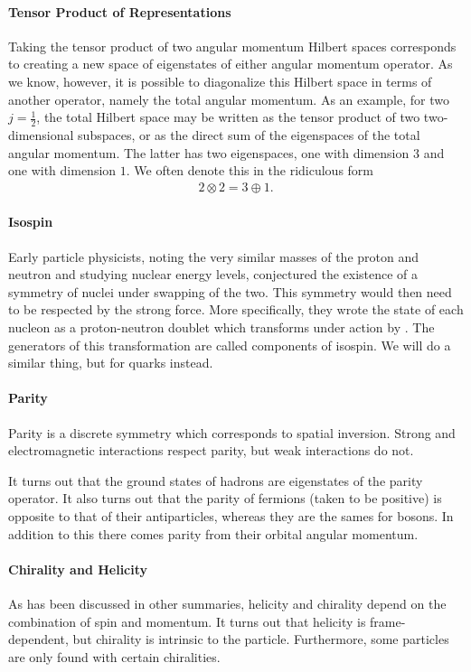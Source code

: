 \paragraph{Tensor Product of  Representations}
Taking the tensor product of two angular momentum Hilbert spaces corresponds to creating a new space of eigenstates of either angular momentum operator. As we know, however, it is possible to diagonalize this Hilbert space in terms of another operator, namely the total angular momentum. As an example, for two $j = \frac{1}{2}$, the total Hilbert space may be written as the tensor product of two two-dimensional subspaces, or as the direct sum of the eigenspaces of the total angular momentum. The latter has two eigenspaces, one with dimension $3$ and one with dimension $1$. We often denote this in the ridiculous form
\begin{align*}
	2\otimes 2 = 3\oplus 1.
\end{align*}

\paragraph{Isospin}
Early particle physicists, noting the very similar masses of the proton and neutron and studying nuclear energy levels, conjectured the existence of a symmetry of nuclei under swapping of the two. This symmetry would then need to be respected by the strong force. More specifically, they wrote the state of each nucleon as a proton-neutron doublet which transforms under action by . The generators of this transformation are called components of isospin. We will do a similar thing, but for quarks instead.

\paragraph{Parity}
Parity is a discrete symmetry which corresponds to spatial inversion. Strong and electromagnetic interactions respect parity, but weak interactions do not.

It turns out that the ground states of hadrons are eigenstates of the parity operator. It also turns out that the parity of fermions (taken to be positive) is opposite to that of their antiparticles, whereas they are the sames for bosons. In addition to this there comes parity from their orbital angular momentum.

\paragraph{Chirality and Helicity}
As has been discussed in other summaries, helicity and chirality depend on the combination of spin and momentum. It turns out that helicity is frame-dependent, but chirality is intrinsic to the particle. Furthermore, some particles are only found with certain chiralities.

